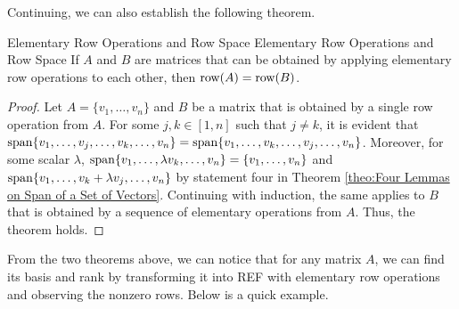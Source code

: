 \documentclass[../main.tex]{subfiles}
\begin{document}
Continuing, we can also establish the following theorem.

\begin{theorem}{Elementary Row Operations and Row Space}
{Elementary Row Operations and Row Space}
If $A$ and $B$ are matrices that can be obtained by applying
elementary row operations to each other, then $\operatorname{row}(A) = \operatorname{row}(B)$.
\end{theorem}
\begin{proof}
Let $A = \{ v_1, \ldots, v_n \}$ and $B$ be a matrix that is obtained
by a single row operation from $A$. For some $j, k \in [1, n]$ such
that $j \neq k$, it is evident that $\Span\{ v_1, \ldots, v_j, \ldots,
v_k, \ldots, v_n \} = \Span\{ v_1,\ldots, v_k, \ldots, v_j, \linebreak
\ldots, v_n \}$. Moreover, for some scalar $\lambda$, $\operatorname{span}\{ v_1,
\ldots, \lambda v_k, \ldots, v_n \} = \{ v_1, \ldots, v_n \}$ and
$\operatorname{span}\{ v_1, \ldots, v_k + \lambda v_j, \ldots, v_n \}$ by statement
four in Theorem \ref{theo:Four Lemmas on Span of a Set of Vectors}.
Continuing with induction, the same applies to $B$ that is obtained by
a sequence of elementary operations from $A$. Thus, the theorem holds.
\end{proof}

From the two theorems above, we can notice that for any matrix $A$,
we can find its basis and rank by transforming it into REF with
elementary row operations and observing the nonzero rows. Below is
a quick example.
\end{document}
